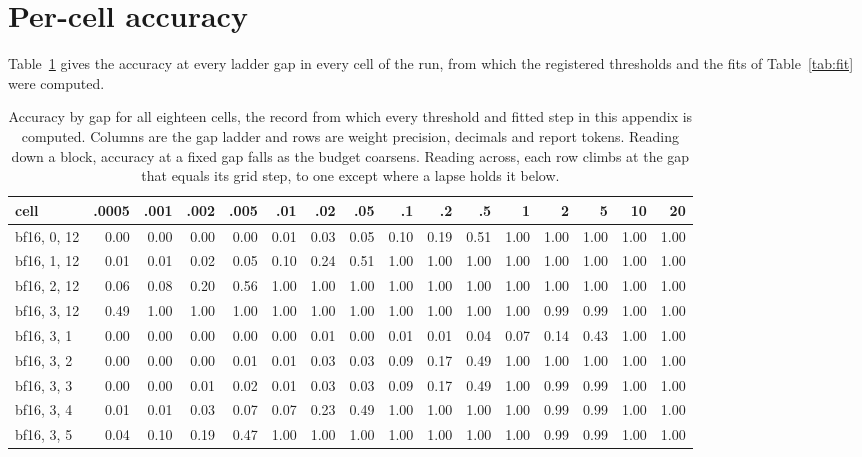 \documentclass{article}
\theoremstyle{definition}
\theoremstyle{remark}
\begin{document}
\fi

\section{Per-cell accuracy}
\label{app:cells}

Table~\ref{tab:cells} gives the accuracy at every ladder gap in every cell of the run, from which the registered thresholds and the fits of Table~\ref{tab:fit} were computed.

\begin{table}[h]
\centering
\scriptsize
\caption{Accuracy by gap for all eighteen cells, the record from which every threshold and fitted step in this appendix is computed.
Columns are the gap ladder and rows are weight precision, decimals and report tokens.
Reading down a block, accuracy at a fixed gap falls as the budget coarsens. Reading across, each row climbs at the gap that equals its grid step, to one except where a lapse holds it below.}
\label{tab:cells}
\setlength{\tabcolsep}{3pt}
\begin{tabular}{lrrrrrrrrrrrrrrr}
\toprule
cell & .0005 & .001 & .002 & .005 & .01 & .02 & .05 & .1 & .2 & .5 & 1 & 2 & 5 & 10 & 20 \\
\midrule
bf16, 0, 12 & 0.00 & 0.00 & 0.00 & 0.00 & 0.01 & 0.03 & 0.05 & 0.10 & 0.19 & 0.51 & 1.00 & 1.00 & 1.00 & 1.00 & 1.00 \\
bf16, 1, 12 & 0.01 & 0.01 & 0.02 & 0.05 & 0.10 & 0.24 & 0.51 & 1.00 & 1.00 & 1.00 & 1.00 & 1.00 & 1.00 & 1.00 & 1.00 \\
bf16, 2, 12 & 0.06 & 0.08 & 0.20 & 0.56 & 1.00 & 1.00 & 1.00 & 1.00 & 1.00 & 1.00 & 1.00 & 1.00 & 1.00 & 1.00 & 1.00 \\
bf16, 3, 12 & 0.49 & 1.00 & 1.00 & 1.00 & 1.00 & 1.00 & 1.00 & 1.00 & 1.00 & 1.00 & 1.00 & 0.99 & 0.99 & 1.00 & 1.00 \\
bf16, 3, 1 & 0.00 & 0.00 & 0.00 & 0.00 & 0.00 & 0.01 & 0.00 & 0.01 & 0.01 & 0.04 & 0.07 & 0.14 & 0.43 & 1.00 & 1.00 \\
bf16, 3, 2 & 0.00 & 0.00 & 0.00 & 0.01 & 0.01 & 0.03 & 0.03 & 0.09 & 0.17 & 0.49 & 1.00 & 1.00 & 1.00 & 1.00 & 1.00 \\
bf16, 3, 3 & 0.00 & 0.00 & 0.01 & 0.02 & 0.01 & 0.03 & 0.03 & 0.09 & 0.17 & 0.49 & 1.00 & 0.99 & 0.99 & 1.00 & 1.00 \\
bf16, 3, 4 & 0.01 & 0.01 & 0.03 & 0.07 & 0.07 & 0.23 & 0.49 & 1.00 & 1.00 & 1.00 & 1.00 & 0.99 & 0.99 & 1.00 & 1.00 \\
bf16, 3, 5 & 0.04 & 0.10 & 0.19 & 0.47 & 1.00 & 1.00 & 1.00 & 1.00 & 1.00 & 1.00 & 1.00 & 0.99 & 0.99 & 1.00 & 1.00 \\

\end{tabular}
\end{table}
\end{document}

